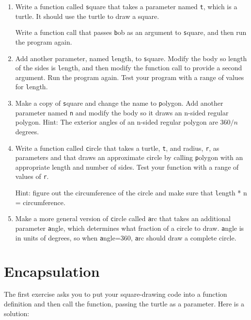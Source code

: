 \documentclass[
DIV=11,
fontsize=13,
twoside,
headinclude=false,
titlepage=firstiscover,
abstract=true,
headsepline=true,
footsepline=true,
chapterprefix=true, %
headings=big,
bibliography=totoc,%
captions=tableheading
]{scrbook}
\theoremstyle{definition}
\begin{document}
\begin{enumerate}

\item Write a function called {\texttt square} that takes a parameter
named {\texttt t}, which is a turtle.  It should use the turtle to draw
a square.

Write a function call that passes {\texttt bob} as an argument to
{\texttt square}, and then run the program again.

\item Add another parameter, named {\texttt length}, to {\texttt square}.
Modify the body so length of the sides is {\texttt length}, and then
modify the function call to provide a second argument.  Run the
program again.  Test your program with a range of values for {\texttt
length}.

\item Make a copy of {\texttt square} and change the name to {\texttt
  polygon}.  Add another parameter named {\texttt n} and modify the body
  so it draws an n-sided regular polygon.  Hint: The exterior angles
  of an n-sided regular polygon are $360/n$ degrees.   

\item Write a function called {\texttt circle} that takes a turtle, 
{\texttt t}, and radius, {\texttt r}, as parameters and that draws an
approximate circle by calling {\texttt polygon} with an appropriate
length and number of sides.  Test your function with a range of values
of {\texttt r}.   

Hint: figure out the circumference of the circle and make sure that
{\texttt length * n = circumference}.

\item Make a more general version of {\texttt circle} called {\texttt arc}
that takes an additional parameter {\texttt angle}, which determines
what fraction of a circle to draw.  {\texttt angle} is in units of
degrees, so when {\texttt angle=360}, {\texttt arc} should draw a complete
circle.

\end{enumerate}


\section{Encapsulation}

The first exercise asks you to put your square-drawing code
into a function definition and then call the function, passing
the turtle as a parameter.  Here is a solution:
\end{document}
